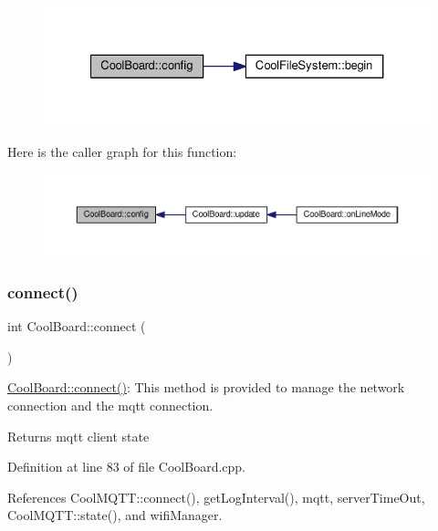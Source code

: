 \nopagebreak
\begin{figure}[H]
\begin{center}
\leavevmode
\includegraphics[width=327pt]{classCoolBoard_a583a874c09c07e70a6eb9229fc4beddb_cgraph}
\end{center}
\end{figure}
Here is the caller graph for this function\+:
\nopagebreak
\begin{figure}[H]
\begin{center}
\leavevmode
\includegraphics[width=350pt]{classCoolBoard_a583a874c09c07e70a6eb9229fc4beddb_icgraph}
\end{center}
\end{figure}
\mbox{\label{classCoolBoard_a519de78b807f8ec6463ff484eb925918}} 
\subsubsection{\texorpdfstring{connect()}{connect()}}
{\footnotesize\ttfamily int Cool\+Board\+::connect (\begin{DoxyParamCaption}{ }\end{DoxyParamCaption})}

\hyperlink{classCoolBoard_a519de78b807f8ec6463ff484eb925918}{Cool\+Board\+::connect()}\+: This method is provided to manage the network connection and the mqtt connection.

\begin{DoxyReturn}{Returns}
mqtt client state 
\end{DoxyReturn}


Definition at line 83 of file Cool\+Board.\+cpp.



References Cool\+M\+Q\+T\+T\+::connect(), get\+Log\+Interval(), mqtt, server\+Time\+Out, Cool\+M\+Q\+T\+T\+::state(), and wifi\+Manager.



